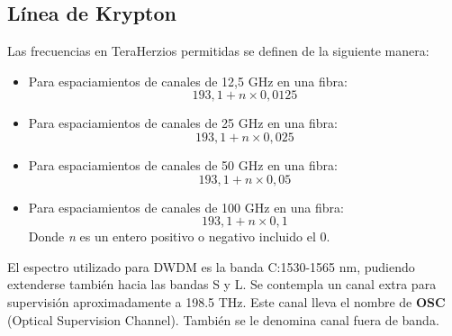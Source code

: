\documentclass[
	12pt, %
	fleqn, %
	a4paper, %
	oneside, %
]{LegrandOrangeBook}
\begin{document}
\subsection{Línea de Krypton}
Las frecuencias en TeraHerzios permitidas se definen de la siguiente manera:
\begin{itemize}
\item Para espaciamientos de canales de 12,5 GHz en una fibra:
\begin{displaymath}
193,1+n\times 0,0125
\end{displaymath}
\item Para espaciamientos de canales de 25 GHz en una fibra:
\begin{displaymath}
193,1+n\times 0,025
\end{displaymath}
\item Para espaciamientos de canales de 50 GHz en una fibra:
\begin{displaymath}
193,1+n\times 0,05
\end{displaymath}
\item Para espaciamientos de canales de 100 GHz en una fibra:
\begin{displaymath}
193,1+n\times 0,1
\end{displaymath}
Donde \textit{n} es un entero positivo o negativo incluido el 0.
\end{itemize}
El espectro utilizado para DWDM es la banda C:1530-1565 nm, pudiendo extenderse también hacia las bandas S y L. Se contempla un canal extra para supervisión aproximadamente a 198.5 THz. Este canal lleva el nombre de \textbf{OSC} (Optical Supervision Channel). También se le denomina canal fuera de banda.
\end{document}
